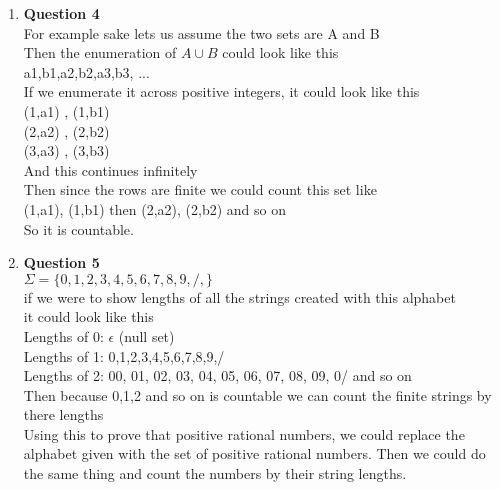 \documentclass[12pt]{article}
\begin{document}
\begin{enumerate}
\item {\bf Question 4} \\
For example sake lets us assume the two sets are A and B \\
Then the enumeration of $A \cup B$ could look like this \\
a1,b1,a2,b2,a3,b3, ... \\
If we enumerate it across positive integers, it could look like this \\
(1,a1) , (1,b1) \\
(2,a2) , (2,b2) \\
(3,a3) , (3,b3) \\
And this continues infinitely \\
Then since the rows are finite we could count this set like \\
(1,a1), (1,b1) then (2,a2), (2,b2) and so on \\
So it is countable. \\


\item {\bf Question 5} \\
$ \Sigma = \{0,1,2,3,4,5,6,7,8,9,/,\}$ \\
if we were to show lengths of all the strings created with this alphabet\\
it could look like this  \\
Lengths of 0: $\epsilon$ (null set) \\
Lengths of 1: 0,1,2,3,4,5,6,7,8,9,/ \\
Lengths of 2: 00, 01, 02, 03, 04, 05, 06, 07, 08, 09, 0/ and so on\\
Then because 0,1,2 and so on is countable we can count the finite strings by there lengths \\
Using this to prove that positive rational numbers, we could replace the alphabet given with the set of positive rational numbers. Then we could do the same thing and count the numbers by their string lengths. \\



\end{enumerate}
\end{document}
